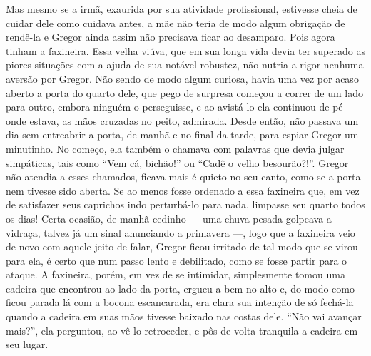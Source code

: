 Mas mesmo se a irmã, exaurida por sua atividade profissional, estivesse
cheia de cuidar dele como cuidava antes, a mãe não teria de modo algum
obrigação de rendê-la e Gregor ainda assim não precisava ficar ao
desamparo. Pois agora tinham a faxineira. Essa velha viúva, que em sua
longa vida devia ter superado as piores situações com a ajuda de sua
notável robustez, não nutria a rigor nenhuma aversão por Gregor. Não sendo
de modo algum curiosa, havia uma vez por acaso aberto a porta do quarto
dele, que pego de surpresa começou a correr de um lado para outro, embora
ninguém o perseguisse, e ao avistá-lo ela continuou de pé onde estava, as
mãos cruzadas no peito, admirada. Desde então, não passava um dia sem
entreabrir a porta, de manhã e no final da tarde, para espiar Gregor um
minutinho. No começo, ela também o chamava com palavras que devia julgar
simpáticas, tais como “Vem cá, bichão!” ou “Cadê o velho besourão?!”.
Gregor não atendia a esses chamados, ficava mais é quieto no seu canto,
como se a porta nem tivesse sido aberta. Se ao menos fosse ordenado a essa
faxineira que, em vez de satisfazer seus caprichos indo perturbá-lo para
nada, limpasse seu quarto todos os dias! Certa ocasião, de manhã cedinho ---
uma chuva pesada golpeava a vidraça, talvez já um sinal anunciando a
primavera ---, logo que a faxineira veio de novo com aquele jeito de falar,
Gregor ficou irritado de tal modo que se virou para ela, é certo que num
passo lento e debilitado, como se fosse partir para o ataque. A faxineira,
porém, em vez de se intimidar, simplesmente tomou uma cadeira que
encontrou ao lado da porta, ergueu-a bem no alto e, do modo como ficou
parada lá com a bocona escancarada, era clara sua intenção de só fechá-la
quando a cadeira em suas mãos tivesse baixado nas costas dele. “Não vai
avançar mais?”, ela perguntou, ao vê-lo retroceder, e pôs de volta
tranquila a cadeira em seu lugar.


